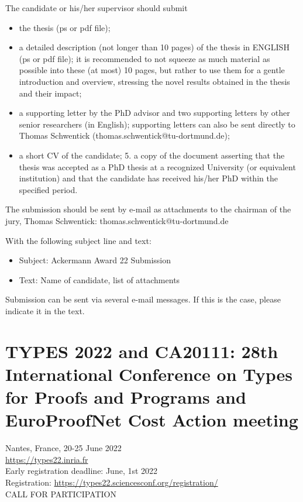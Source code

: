 \documentclass[prodmode,acmtecs]{acmsmall} %
\begin{document}
\begin{itemize}
  The candidate or his/her supervisor should submit 
 
\begin{itemize}\item  the thesis (ps or pdf file); 
\item  a detailed description (not longer than 10 pages) of the thesis in ENGLISH (ps or pdf file); it is recommended to not squeeze as much material as possible into these (at most) 10 pages, but rather to use them for a gentle introduction and overview, stressing the novel results obtained in the thesis and their impact; 
\item  a supporting letter by the PhD advisor and two supporting letters by other senior researchers (in English); supporting letters can also be sent directly to Thomas Schwentick (thomas.schwentick@tu-dortmund.de); 
\item  a short CV of the candidate; 5. a copy of the document asserting that the thesis was accepted as a PhD thesis at a recognized University (or equivalent institution) and that the candidate has received his/her PhD within the specified period.
\end{itemize} 
  The submission should be sent by e-mail as attachments to the chairman of the jury, Thomas Schwentick: thomas.schwentick@tu-dortmund.de 
 
  With the following subject line and text: 
 
\begin{itemize}\item  Subject: Ackermann Award 22 Submission 
\item  Text: Name of candidate, list of attachments
\end{itemize} 
  Submission can be sent via several e-mail messages. If this is the case, please indicate it in the text.  
 
\end{itemize}\section{TYPES 2022 and CA20111: 28th International Conference on Types for Proofs and Programs and EuroProofNet Cost Action meeting}\label{TYPES2022andCA20111}  Nantes, France, 20-25 June 2022 \\ 
  \href{https://types22.inria.fr}{https://types22.inria.fr}\\ 
  Early registration deadline: June, 1st 2022\\ 
  Registration: \href{https://types22.sciencesconf.org/registration/}{https://types22.sciencesconf.org/registration/}\\ 
CALL FOR PARTICIPATION 
\end{document}
